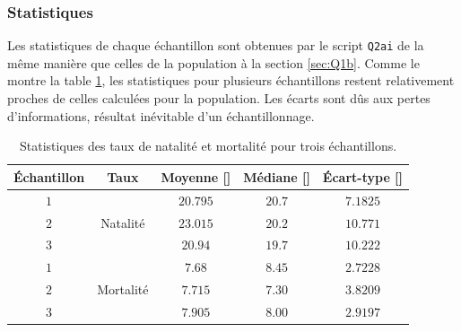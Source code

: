 \documentclass[a4paper, 12pt]{article}
\def\ptsd{\textperthousand}
\begin{document}
	\subsubsection{Statistiques} \label{sec:Q2ai}
	Les statistiques de chaque échantillon sont obtenues par le script \texttt{Q2ai} de la même manière que celles de la population à la section \ref{sec:Q1b}. Comme le montre la table \ref{table:Q2ai}, les statistiques pour plusieurs échantillons restent relativement proches de celles calculées pour la population. Les écarts sont dûs aux pertes d'informations, résultat inévitable d'un échantillonnage. \par
	\begin{table}[h!]
		\centering
		\begin{tabular}{|c|c|c|c|c|}
			\hline
			Échantillon &            Taux            & Moyenne [\ptsd] & Médiane [\ptsd] & Écart-type [\ptsd] \\ \hline\hline
			    $1$     & \multirow{3}{*}{Natalité}  & $\num{20.795}$  &  $\num{20.7}$   &   $\num{7.1825}$   \\ \cline{1-1}\cline{3-5}
			    $2$     &                            & $\num{23.015}$  &  $\num{20.2}$   &   $\num{10.771}$   \\ \cline{1-1}\cline{3-5}
			    $3$     &                            &  $\num{20.94}$  &  $\num{19.7}$   &   $\num{10.222}$   \\ \hline\hline
			    $1$     & \multirow{3}{*}{Mortalité} &  $\num{7.68}$   &  $\num{8.45}$   &   $\num{2.7228}$   \\ \cline{1-1}\cline{3-5}
			    $2$     &                            &  $\num{7.715}$  &  $\num{7.30}$   &   $\num{3.8209}$   \\ \cline{1-1}\cline{3-5}
			    $3$     &                            &  $\num{7.905}$  &  $\num{8.00}$   &   $\num{2.9197}$   \\ \hline
		\end{tabular}
		\caption{Statistiques des taux de natalité et mortalité pour trois échantillons.}
		\label{table:Q2ai}
	\end{table}
\end{document}
